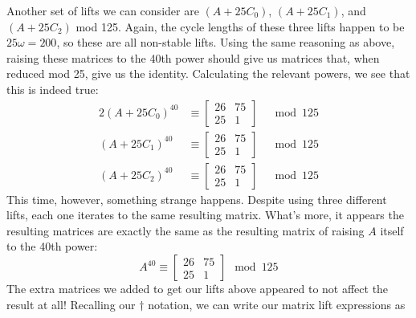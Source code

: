 \documentclass[a4paper, 12pt, reqno]{amsart}
\begin{document}
		Another set of lifts we can consider are $(A + 25C_0)$, $(A + 25C_1)$, and $(A + 25C_2)$ mod 125. Again, the cycle lengths of these three lifts happen to be 
		$25\omega = 200$, so these are all non-stable lifts. Using the same reasoning as above, raising these matrices to the 40th power should give us matrices that, when 
		reduced mod 25, give us the identity. Calculating the relevant powers, we see that this is indeed true:
		\begin{alignat*}{2}
			(A + 25C_0)^{40} & \equiv \begin{bmatrix}
				26 & 75 \\
				25 &  1
			\end{bmatrix} & \mod{125} \\
			(A + 25C_1)^{40} & \equiv \begin{bmatrix}
				26 & 75 \\
				25 &  1
			\end{bmatrix} & \mod{125} \\
			(A + 25C_2)^{40} & \equiv \begin{bmatrix}
				26 & 75 \\
				25 &  1
			\end{bmatrix} & \mod{125}
		\end{alignat*}
		This time, however, something strange happens. Despite using three different lifts, each one iterates to the same resulting matrix. What's more, it appears the 
		resulting matrices are exactly the same as the resulting matrix of raising $A$ itself to the 40th power:
		\[
			A^{40} \equiv \begin{bmatrix}
				26 & 75 \\
				25 &  1
			\end{bmatrix} \mod{125}
		\]
		The extra matrices we added to get our lifts above appeared to not affect the result at all! Recalling our $\dag$ notation, we can write our matrix lift expressions
		as
\end{document}
